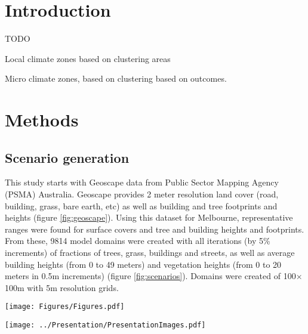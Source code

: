 \documentclass[final,3p,times,authoryear]{elsarticle}
\begin{document}
\maketitle





\section{Introduction}
TODO
   

Local climate zones based on clustering areas

Micro climate zones, based on clustering based on outcomes.

\section{Methods}\label{sec:methods}

\subsection{Scenario generation}\label{sec:methodsgen}
This study starts with Geoscape \citep{Geoscape2020} data from Public Sector Mapping Agency (PSMA) Australia. Geoscape provides 2 meter resolution land cover (road, building, grass, bare earth, etc) as well as building and tree footprints and heights (figure \ref{fig:geoscape}). Using this dataset for Melbourne, representative ranges were found for surface covers and tree and building heights and footprints. From these, 9814 model domains were created with all iterations (by 5\% increments) of fractions of trees, grass, buildings and streets, as well as average building heights (from 0 to 49 meters) and vegetation heights (from 0 to 20 meters in 0.5m increments) (figure \ref{fig:scenarios}). Domains were created of 100$\times$100m with 5m resolution grids.



\begin{figure*}
\centering
\texttt{[image: Figures/Figures.pdf]}
\caption{\bf 2m surface cover (bare earth, roads, grass, trees, water, and buildings), building footprints and heights, and tree cover locations and heights from Geoscape for Melbourne.}
 \label{fig:geoscape}
\end{figure*} 

\begin{figure*}
\centering
\texttt{[image: ../Presentation/PresentationImages.pdf]}
\caption{\bf Melbourne, parameter ranges.}
\end{figure*} 
\end{document}
